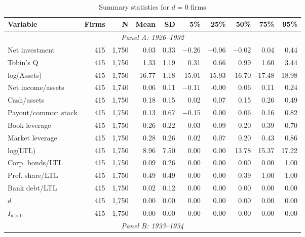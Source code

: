 \begin{table}[p]\centering
    \caption{\\ Summary statistics for $d = 0$ firms}\scriptsize
    \label{tabapp:summary_d_0}
    \begin{threeparttable}
        \begin{tabular}{lrrrrrrrrr}
            \toprule
            Variable & Firms & N & Mean & SD & 5\% & 25\% & 50\% & 75\% & 95\% \\
            \midrule
            \multicolumn{10}{c}{\textit{Panel A: 1926--1932}} \\
            \midrule
            Net investment & 415 & 1,750 & 0.03 & 0.33 & $-$0.26 & $-$0.06 & $-$0.02 & 0.04 & 0.44 \\
            Tobin's Q & 415 & 1,750 & 1.33 & 1.19 & 0.31 & 0.66 & 0.99 & 1.60 & 3.44 \\
            log(Assets) & 415 & 1,750 & 16.77 & 1.18 & 15.01 & 15.93 & 16.70 & 17.48 & 18.98 \\
            Net income/assets & 415 & 1,740 & 0.06 & 0.11 & $-$0.11 & -0.00 & 0.06 & 0.11 & 0.24 \\
            Cash/assets & 415 & 1,750 & 0.18 & 0.15 & 0.02 & 0.07 & 0.15 & 0.26 & 0.49 \\
            Payout/common stock & 415 & 1,750 & 0.13 & 0.67 & $-$0.15 & 0.00 & 0.06 & 0.16 & 0.82 \\
            Book leverage & 415 & 1,750 & 0.26 & 0.22 & 0.03 & 0.09 & 0.20 & 0.39 & 0.70 \\
            Market leverage & 415 & 1,750 & 0.28 & 0.26 & 0.02 & 0.07 & 0.20 & 0.43 & 0.86 \\
            log(LTL) & 415 & 1,750 & 8.96 & 7.50 & 0.00 & 0.00 & 13.78 & 15.37 & 17.22 \\
            Corp. bonds/LTL & 415 & 1,750 & 0.09 & 0.26 & 0.00 & 0.00 & 0.00 & 0.00 & 1.00 \\
            Pref. share/LTL & 415 & 1,750 & 0.49 & 0.49 & 0.00 & 0.00 & 0.39 & 1.00 & 1.00 \\
            Bank debt/LTL & 415 & 1,750 & 0.02 & 0.12 & 0.00 & 0.00 & 0.00 & 0.00 & 0.00 \\
            \ensuremath{d} & 415 & 1,750 & 0.00 & 0.00 & 0.00 & 0.00 & 0.00 & 0.00 & 0.00 \\
            \ensuremath{I_{d>0}} & 415 & 1,750 & 0.00 & 0.00 & 0.00 & 0.00 & 0.00 & 0.00 & 0.00 \\
            \midrule
            \multicolumn{10}{c}{\textit{Panel B: 1933--1934}} \\

\end{tabular}
\end{threeparttable}
\end{table}
